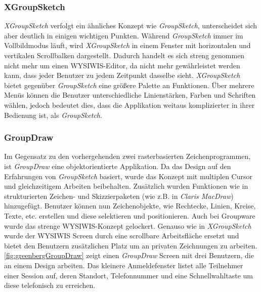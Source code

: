 \subsubsection{XGroupSketch}
\emph{XGroupSketch} verfolgt ein ähnliches Konzept wie \emph{GroupSketch}, unterscheidet sich aber deutlich in einigen wichtigen Punkten. Während \emph{GroupSketch} immer im Vollbildmodus läuft, wird \emph{XGroupSketch} in einem Fenster mit horizontalen und vertikalen Scrollbalken dargestellt. Dadurch handelt es sich streng genommen nicht mehr um einen WYSIWIS-Editor, da nicht mehr gewährleistet werden kann, dass jeder Benutzer zu jedem Zeitpunkt dasselbe sieht. \emph{XGroupSketch} bietet gegenüber \emph{GroupSketch} eine größere Palette an Funktionen. Über mehrere Menüs können die Benutzer unterschiedliche Linienstärken, Farben und Schriften wählen, jedoch bedeutet dies, dass die Applikation weitaus komplizierter in ihrer Bedienung ist, als \emph{GroupSketch}.

\subsubsection{GroupDraw}
Im Gegensatz zu den vorhergehenden zwei rasterbasierten Zeichenprogrammen, ist \emph{GroupDraw} eine objektorientierte Applikation. Da das Design auf den Erfahrungen von \emph{GroupSketch} basiert, wurde das Konzept mit multiplen Cursor und gleichzeitigem Arbeiten beibehalten. Zusätzlich wurden Funktionen wie in strukturierten Zeichen- und Skizzierpaketen (wie z.B. in \emph{Claris MacDraw}) hinzugefügt. Benutzer können nun Zeichenobjekte, wie Rechtecke, Linien, Kreise, Texte, etc. erstellen und diese selektieren und positionieren. Auch bei Groupware wurde das strenge WYSIWIS-Konzept gelockert. Genauso wie in \emph{XGroupSketch} wurde der WYSIWIS Screen durch eine scrollbare Arbeitsfläche ersetzt und bietet den Benutzern zusätzlichen Platz um an privaten Zeichnungen zu arbeiten. \autoref{fig:greenbergGroupDraw} zeigt einen \emph{GroupDraw} Screen mit drei Benutzern, die an einem Design arbeiten. Das kleinere Anmeldefenster listet alle Teilnehmer einer Session auf, deren Standort, Telefonnummer und eine Schnellwahltaste um diese telefonisch zu erreichen.


